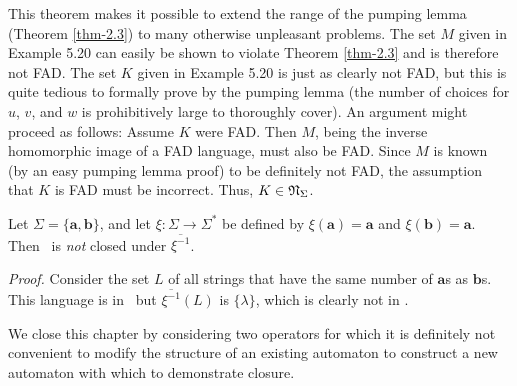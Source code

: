 This theorem makes it possible to extend the range of the pumping lemma (Theorem
\ref{thm-2.3}) to many otherwise unpleasant problems. The set $M$ given in Example 5.20
can easily be shown to violate Theorem \ref{thm-2.3} and is therefore not FAD. The set $K$
given in Example 5.20 is just as clearly not FAD, but this is quite tedious to
formally prove by the pumping lemma (the number of choices for $u$, $v$, and $w$
is prohibitively large to thoroughly cover). An argument might proceed as
follows: Assume $K$ were FAD. Then $M$, being the inverse homomorphic image of a
FAD language, must also be FAD. Since $M$ is known (by an easy pumping lemma
proof) to be definitely not FAD, the assumption that $K$ is FAD must be
incorrect. Thus, $K \in \mathfrak{N}_\Sigma$.

\begin{lmm}\label{lmm-5.5}
Let $\Sigma=\{\pmb{a},\pmb{b}\}$, and let $\xi$$: \Sigma\rightarrow\Sigma^*$ be
defined by $\xi(\pmb{a})=\pmb{a}$ and $\xi(\pmb{b})=\pmb{a}$. Then \NSIG\ is
\emph{not} closed under $\overline{\xi^{-1}}$.

\emph{Proof.} Consider the set $L$ of all strings that have the same number of
$\pmb{a}$s as $\pmb{b}$s. This language is in \NSIG\ but $\overline{\xi^{-1}}(L)$ is
$\{\lambda\}$, which is clearly not in \NSIG.
\end{lmm}

We close this chapter by considering two operators for which it is definitely
not convenient to modify the structure of an existing automaton to construct a
new automaton with which to demonstrate closure.

